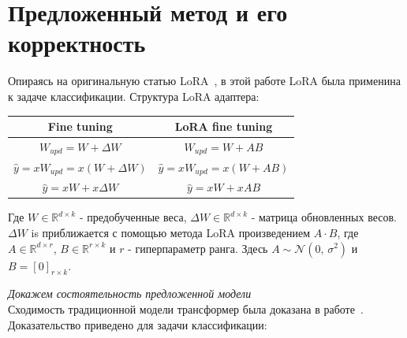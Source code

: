 \newpage

\section{Предложенный метод и его корректность}
Опираясь на оригинальную статью LoRA~\cite{hu2021lora}, в этой работе LoRA была применина к задаче классификации. Структура LoRA адаптера:
\begin{center}
\begin{tabular}{ | c | c| } 
 \hline
  Fine tuning & LoRA fine tuning\\ 
 \hline
 $W_{upd} = W + \Delta W$ & $W_{upd} = W + AB$\\ 
 $\hat{y} = xW_{upd}= x(W + \Delta W)$ & $\hat{y} = xW_{upd}= x(W + AB)$\\
 $\hat{y} = xW + x\Delta W$ & $\hat{y} = xW + xAB$ \\
 \hline
\end{tabular}
\end{center}
Где $W \in \mathbb{R}^{d \times k}$ - предобученные веса, $\Delta W \in \mathbb{R}^{d \times k}$ - матрица обновленных весов. $\Delta W$ is приближается с помощью метода LoRA произведением $A \cdot B$, где $A \in \mathbb{R}^{d \times r}$, $B \in \mathbb{R}^{r \times k}$ и $r$ - гиперпараметр ранга. \newline
Здесь $A \sim \mathcal{N}(0,\,\sigma^{2})$ и $B = [0]_{r \times k}$.


\textit{Докажем состоятельность предложенной модели}\\
Сходимость традиционной модели трансформер была доказана в работе~\cite{lee2023mathematical}. Доказательство приведено для задачи классификации:

